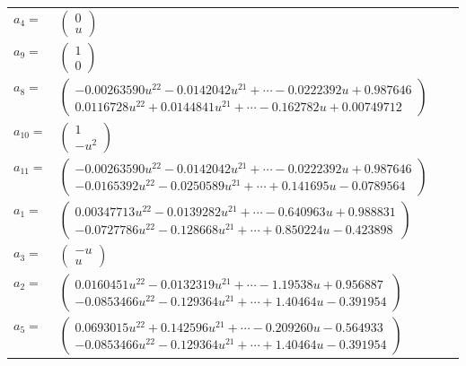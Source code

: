 \documentclass[1p]{elsarticle_modified}
\theoremstyle{definition}
\begin{document}
\begin{tabular}{m{7pt} m{180pt} m{7pt} m{180pt} }
\flushright $a_{4}=$&$\begin{pmatrix}0\\u\end{pmatrix}$ \\
\flushright $a_{9}=$&$\begin{pmatrix}1\\0\end{pmatrix}$ \\
\flushright $a_{8}=$&$\begin{pmatrix}-0.00263590 u^{22}-0.0142042 u^{21}+\cdots-0.0222392 u+0.987646\\0.0116728 u^{22}+0.0144841 u^{21}+\cdots-0.162782 u+0.00749712\end{pmatrix}$ \\
\flushright $a_{10}=$&$\begin{pmatrix}1\\- u^2\end{pmatrix}$ \\
\flushright $a_{11}=$&$\begin{pmatrix}-0.00263590 u^{22}-0.0142042 u^{21}+\cdots-0.0222392 u+0.987646\\-0.0165392 u^{22}-0.0250589 u^{21}+\cdots+0.141695 u-0.0789564\end{pmatrix}$ \\
\flushright $a_{1}=$&$\begin{pmatrix}0.00347713 u^{22}-0.0139282 u^{21}+\cdots-0.640963 u+0.988831\\-0.0727786 u^{22}-0.128668 u^{21}+\cdots+0.850224 u-0.423898\end{pmatrix}$ \\
\flushright $a_{3}=$&$\begin{pmatrix}- u\\u\end{pmatrix}$ \\
\flushright $a_{2}=$&$\begin{pmatrix}0.0160451 u^{22}-0.0132319 u^{21}+\cdots-1.19538 u+0.956887\\-0.0853466 u^{22}-0.129364 u^{21}+\cdots+1.40464 u-0.391954\end{pmatrix}$ \\
\flushright $a_{5}=$&$\begin{pmatrix}0.0693015 u^{22}+0.142596 u^{21}+\cdots-0.209260 u-0.564933\\-0.0853466 u^{22}-0.129364 u^{21}+\cdots+1.40464 u-0.391954\end{pmatrix}$ \\

\end{tabular}
\end{document}

